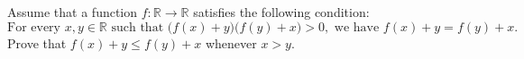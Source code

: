 Assume that a function $f \colon \mathbb{R} \to \mathbb{R}$ satisfies the following condition:
\[
\text{For every } x, y \in \mathbb{R} \text{ such that } \bigl(f(x) + y\bigr)\bigl(f(y) + x\bigr) > 0, \text{ we have } f(x) + y = f(y) + x.
\]
Prove that $f(x) + y \leq f(y) + x$ whenever $x > y$.
